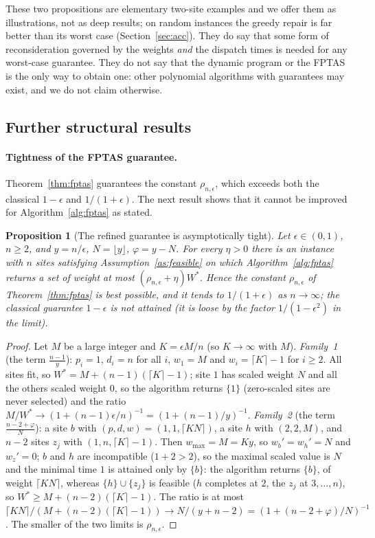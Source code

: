\documentclass[pdflatex,sn-mathphys-ay]{sn-jnl}
\theoremstyle{thmstyleone}
\newtheorem{proposition}[theorem]{Proposition}
\theoremstyle{thmstyletwo}
\theoremstyle{thmstylethree}
\begin{document}
These two propositions are elementary two-site examples and we offer
them as illustrations, not as deep results; on random instances the
greedy repair is far better than its worst case
(Section~\ref{sec:acc}). They do say that some form of reconsideration
governed by the weights \emph{and} the dispatch times is needed for any
worst-case guarantee. They do not say that the dynamic program or the
FPTAS is the only way to obtain one: other polynomial algorithms with
guarantees may exist, and we do not claim otherwise.

\subsection{Further structural results}\label{sec:structure}

\paragraph{Tightness of the FPTAS guarantee.} Theorem~\ref{thm:fptas}
guarantees the constant $\rho_{n,\epsilon}$, which exceeds both the
classical $1-\epsilon$ and $1/(1+\epsilon)$. The next result shows that
it cannot be improved for Algorithm~\ref{alg:fptas} as stated.

\begin{proposition}[The refined guarantee is asymptotically tight]\label{prop:tight}
Let $\epsilon\in(0,1)$, $n\ge2$, and $y=n/\epsilon$, $N=\lfloor y\rfloor$,
$\varphi=y-N$. For every $\eta>0$ there is an instance with $n$ sites satisfying
Assumption~\ref{as:feasible} on which Algorithm~\ref{alg:fptas} returns a
set of weight at most $(\rho_{n,\epsilon}+\eta)W^\ast$. Hence the constant
$\rho_{n,\epsilon}$ of Theorem~\ref{thm:fptas} is best possible, and it
tends to $1/(1+\epsilon)$ as $n\to\infty$; the classical guarantee
$1-\epsilon$ is not attained (it is loose by the factor
$1/(1-\epsilon^2)$ in the limit).
\end{proposition}

\begin{proof}
Let $M$ be a large integer and $K=\epsilon M/n$ (so $K\to\infty$ with
$M$). \emph{Family~1} (the term $\tfrac{n-1}{y}$): $p_i=1$, $d_i=n$ for
all $i$, $w_1=M$ and $w_i=\lceil K\rceil-1$ for $i\ge2$. All sites fit, so
$W^\ast=M+(n-1)(\lceil K\rceil-1)$; site $1$ has scaled weight $N$ and all
the others scaled weight $0$, so the algorithm returns $\{1\}$ (zero-scaled
sites are never selected) and the ratio
$M/W^\ast\to(1+(n-1)\epsilon/n)^{-1}=(1+(n-1)/y)^{-1}$.
\emph{Family~2} (the term $\tfrac{n-2+\varphi}{N}$): a site $b$ with
$(p,d,w)=(1,1,\lceil KN\rceil)$, a site $h$ with $(2,2,M)$, and $n-2$
sites $z_j$ with $(1,n,\lceil K\rceil-1)$. Then $w_{\max}=M=Ky$, so
$w_b'=w_h'=N$ and $w_{z}'=0$; $b$ and $h$ are incompatible ($1+2>2$), so
the maximal scaled value is $N$ and the minimal time $1$ is attained only
by $\{b\}$: the algorithm returns $\{b\}$, of weight $\lceil KN\rceil$,
whereas $\{h\}\cup\{z_j\}$ is feasible ($h$ completes at $2$, the $z_j$ at
$3,\dots,n$), so $W^\ast\ge M+(n-2)(\lceil K\rceil-1)$. The ratio is at
most $\lceil KN\rceil/(M+(n-2)(\lceil K\rceil-1))\to
N/(y+n-2)=(1+(n-2+\varphi)/N)^{-1}$. The smaller of the two limits is
$\rho_{n,\epsilon}$.
\end{proof}
\end{document}
